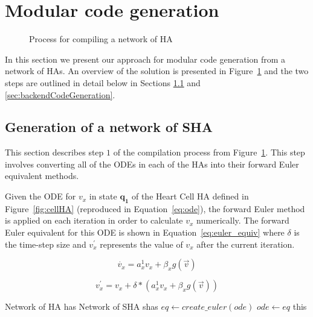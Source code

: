 \section{Modular code generation}
\label{sec:codeGen}

\begin{figure}[t!]
	\centering
	\scalebox{0.7}{
		
	}
	\caption{Process for compiling a network of \acf{HA}}
	\label{fig:compilingHA}
\end{figure}

In this section we present our approach for modular code generation from
a network of \acp{HA}. 
An overview of the solution is presented in Figure~\ref{fig:compilingHA} and the two steps are outlined in detail below in Sections \ref{sec:shaGeneration} and \ref{sec:backendCodeGeneration}.

\subsection{Generation of a network of \ac{SHA}}
\label{sec:shaGeneration}

This section describes step $1$ of the compilation process from Figure~\ref{fig:compilingHA}.
This step involves converting all of the \acp{ODE} in each of the \acp{HA} into their forward Euler equivalent methods.

Given the \ac{ODE} for $v_x$ in state $\mathbf{q_1}$ of the Heart Cell \ac{HA} defined in Figure~\ref{fig:cellHA} (reproduced in Equation~\ref{eq:ode}), the forward Euler method is applied on each iteration in order to calculate $v_x$ numerically.
The forward Euler equivalent for this ODE is shown in Equation~\ref{eq:euler_equiv} where $\delta$ is the time-step size and $v^\prime_x$ represents the value of $v_x$ after the current iteration.

\begin{equation}
\dot{v_x} = a^1_x v_x + \beta_x g(\vec{v})
\label{eq:ode}
\end{equation}

\begin{equation}
v^\prime_x = v_x + \delta * (a^1_x v_x + \beta_x g(\vec{v}))
\label{eq:euler_equiv}
\end{equation}

\renewcommand{\algorithmiccomment}[1]{// #1}
\renewcommand{\algorithmicrequire}{\textbf{Input:}}
\renewcommand{\algorithmicensure}{\textbf{Output:}}
\begin{algorithm}[t!]
	\begin{algorithmic}[1]
		\REQUIRE Network of HA has 
		\ENSURE Network of SHA shas
		 \label{alg:HAsToSHAs:allHAs}
			  \label{alg:HAsToSHAs:allLocs}
				 \label{alg:HAsToSHAs:allODEs}
					\STATE $eq \leftarrow create\_euler(ode)$ \label{alg:HAsToSHAs:createEuler}
					\STATE $ode \leftarrow eq$ \label{alg:HAsToSHAs:assignOde}
				\ENDFOR
			\ENDFOR
		\ENDFOR
		\RETURN this
	\end{algorithmic}
	\caption{The algorithm to generate a Network of \acp{SHA} from a Network of \acp{HA}}
	\label{alg:HAsToSHAs}
\end{algorithm}


